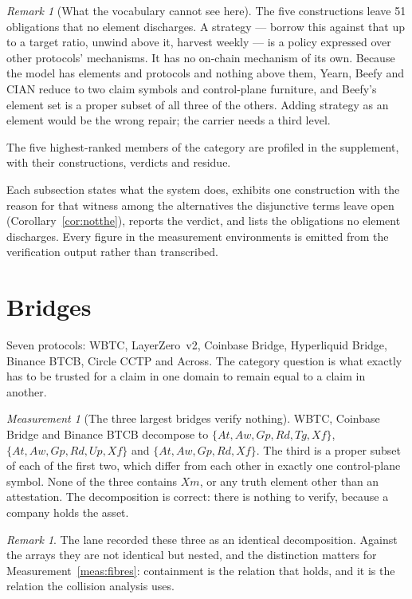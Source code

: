 \documentclass[11pt,reqno]{amsart}
\theoremstyle{plain}
\theoremstyle{definition}
\theoremstyle{remark}
\newtheorem{measurement}[theorem]{Measurement}
\newtheorem{remark}[theorem]{Remark}
\begin{document}
\begin{remark}[What the vocabulary cannot see here]
The five constructions leave 51 obligations that no element discharges. A strategy --- borrow this
against that up to a target ratio, unwind above it, harvest weekly --- is a
policy expressed over other protocols' mechanisms. It has no on-chain mechanism
of its own. Because the model has elements and protocols and nothing above them,
Yearn, Beefy and CIAN reduce to two claim symbols and control-plane furniture,
and Beefy's element set is a proper subset of all three of the others. Adding
strategy as an element would be the wrong repair; the carrier needs a third
level.
\end{remark}

The five highest-ranked members of the category are profiled in the
supplement, with their constructions, verdicts and residue.

Each
subsection states what the system does, exhibits one construction with the
reason for that witness among the alternatives the disjunctive terms leave open
(Corollary~\ref{cor:notthe}), reports the verdict, and lists the obligations no
element discharges. Every figure in the measurement environments is emitted from
the verification output rather than transcribed.

\section{Bridges}\label{sec:cat:bridge}

Seven protocols: WBTC, LayerZero~v2, Coinbase Bridge, Hyperliquid Bridge,
Binance BTCB, Circle CCTP and Across. The category question is what exactly has
to be trusted for a claim in one domain to remain equal to a claim in another.

\begin{measurement}[The three largest bridges verify nothing]\label{meas:cat:bridgetop}
WBTC, Coinbase Bridge and Binance BTCB decompose to $\{At,Aw,Gp,Rd,Tg,Xf\}$,
$\{At,Aw,Gp,Rd,Up,Xf\}$ and $\{At,Aw,Gp,Rd,Xf\}$. The third is a proper subset
of each of the first two, which differ from each other in exactly one
control-plane symbol. None of the three contains $Xm$, or any truth element
other than an attestation. The decomposition is correct: there is nothing to
verify, because a company holds the asset.
\end{measurement}

\begin{remark}
The lane recorded these three as an identical decomposition. Against the arrays
they are not identical but nested, and the distinction matters for
Measurement~\ref{meas:fibres}: containment is the relation that holds, and it is
the relation the collision analysis uses.
\end{remark}
\end{document}
